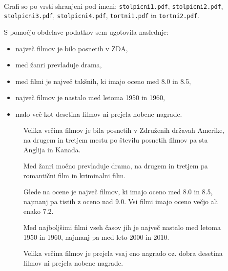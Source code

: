 \documentclass[11pt,a4paper]{article}
\begin{document}
\paragraph{} Grafi so po vrsti shranjeni pod imeni: \verb|stolpicni1.pdf|, \verb|stolpicni2.pdf|, \verb|stolpicni3.pdf|, \verb|stolpicni4.pdf|, \verb|tortni1.pdf| in \verb|tortni2.pdf|.

\null
\null
S pomočjo obdelave podatkov sem ugotovila naslednje:
\begin{itemize}
\item največ filmov je bilo posnetih v ZDA,
\item med žanri prevladuje drama,
\item med filmi je največ takšnih, ki imajo oceno med 8.0 in 8.5,
\item največ filmov je nastalo med letoma 1950 in 1960,
\item malo več kot desetina filmov ni prejela nobene nagrade.
\end{itemize}

\pagebreak
\begin{figure}[H]

\caption{Velika večina filmov je bila posnetih v Združenih državah Amerike, na drugem in tretjem mestu po številu posnetih filmov pa sta Anglija in Kanada.}
\end{figure}

\pagebreak
\begin{figure}[H]

\caption{Med žanri močno prevladuje drama, na drugem in tretjem pa romantični film in kriminalni film.}
\end{figure}

\pagebreak
\begin{figure}[H]

\caption{Glede na ocene je največ filmov, ki imajo oceno med 8.0 in 8.5, najmanj pa tistih z oceno nad 9.0. Vsi filmi imajo oceno večjo ali enako 7.2.}
\end{figure}

\pagebreak
\begin{figure}[H]

\caption{Med najboljšimi filmi vseh časov jih je največ nastalo med letoma 1950 in 1960, najmanj pa med leto 2000 in 2010.}
\end{figure}

\pagebreak
\begin{figure}[H]

\caption{Velika večina filmov je prejela vsaj eno nagrado oz. dobra desetina filmov ni prejela nobene nagrade.}
\end{figure}
\end{document}
